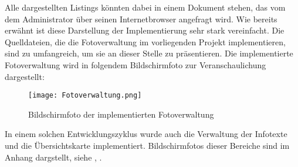 

Alle dargestellten Listings könnten dabei in einem Dokument stehen, das vom dem Administrator über seinen Internetbrowser angefragt wird.
Wie bereits erwähnt ist diese Darstellung der Implementierung sehr stark vereinfacht. Die Quelldateien, die die Fotoverwaltung im vorliegenden Projekt implementieren, sind zu umfangreich, um sie an dieser Stelle zu präsentieren. Die implementierte Fotoverwaltung wird in folgendem Bildschirmfoto zur Veranschaulichung dargestellt:

\begin{figure}[htb]
\centering
\texttt{[image: Fotoverwaltung.png]}
\caption[Fotoverwaltung]{Bildschirmfoto der implementierten Fotoverwaltung}
\label{fig:Fotoverwaltung}
\end{figure}

In einem solchen Entwicklungszyklus wurde auch die Verwaltung der Infotexte und die Übersichtskarte implementiert. Bildschirmfotos dieser Bereiche sind im Anhang dargstellt, siehe , .